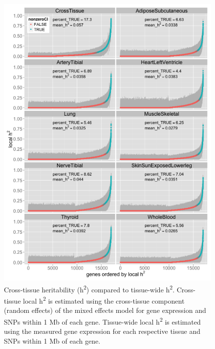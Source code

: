 \documentclass[]{article}
\begin{document}
\begin{figure}[htbp]
\centering
\includegraphics{GenArch_manuscript_files/figure-latex/otdTWh2-1.pdf}
\caption{Cross-tissue heritability (h\textsuperscript{2}) compared to
tissue-wide h\textsuperscript{2}. Cross-tissue local
h\textsuperscript{2} is estimated using the cross-tissue component
(random effects) of the mixed effects model for gene expression and SNPs
within 1 Mb of each gene. Tissue-wide local h\textsuperscript{2} is
estimated using the measured gene expression for each respective tissue
and SNPs within 1 Mb of each gene.}
\end{figure}
\end{document}
